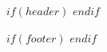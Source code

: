 \newcommand{\mytitle}{$title$}
\newcommand{\mysubtitle}{$subtitle$}
\newcommand{\mybody}{$body$}

$if(header)$
\newcommand{\myheader}{$header$}
$endif$

$if(footer)$
\newcommand{\myfooter}{$footer$}
$endif$

